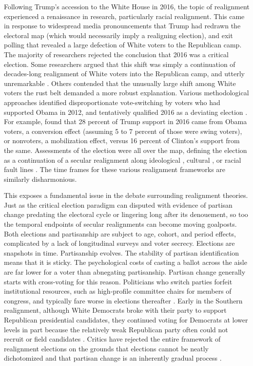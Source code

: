 Following Trump's accession to the White House in 2016, the topic of realignment experienced a renaissance in research, particularly racial realignment. This came in response to widespread media pronouncements that Trump had redrawn the electoral map (which would necessarily imply a realigning election), and exit polling that revealed a large defection of White voters to the Republican camp. The majority of researchers rejected the conclusion that 2016 was a critical election. Some researchers argued that this shift was simply a continuation of decades-long realignment of White voters into the Republican camp, and utterly unremarkable \citep{carnes_white_2021, johnston_was_2017, bartels_analysis_2016}. Others contended that the unusually large shift among White voters the rust belt demanded a more robust explanation. Various methodological approaches identified disproportionate vote-switching by voters who had supported Obama in 2012, and tentatively qualified 2016 as a deviating election \citep{morgan_trump_2018, reny_vote_2019, mutz_status_2018}. For example, \citet{morgan_trump_2018} found that 28 percent of Trump support in 2016 came from Obama voters, a conversion effect (assuming 5 to 7 percent of those were swing voters), or nonvoters, a mobilization effect, versus 16 percent of Clinton's support from the same. Assessments of the election were all over the map, defining the election as a continuation of a secular realignment along ideological \citep{abramowitz_united_2019}, cultural \citep{highton_cultural_2020}, or racial fault lines \citep{kitschelt_secular_2019}. The time frames for these various realignment frameworks are similarly disharmonious. 

This exposes a fundamental issue in the debate surrounding realignment theories. Just as the critical election paradigm can disputed with evidence of partisan change predating the electoral cycle or lingering long after its denouement, so too the temporal endpoints of secular realignments can become moving goalposts. Both elections and partisanship are subject to age, cohort, and period effects, complicated by a lack of longitudinal surveys and voter secrecy. Elections are snapshots in time. Partisanship evolves. The stability of partisan identification means that it is sticky. The psychological costs of casting a ballot across the aisle are far lower for a voter than abnegating partisanship. Partisan change generally starts with cross-voting for this reason. Politicians who switch parties forfeit institutional resources, such as high-profile committee chairs for members of congress, and typically fare worse in elections thereafter \citep{grose_electoral_2003}. Early in the Southern realignment, although White Democrats broke with their party to support Republican presidential candidates, they continued voting for Democrats at lower levels in part because the relatively weak Republican party often could not recruit or field candidates \citep{black_rise_2009}. Critics have rejected the entire framework of realignment elections on the grounds that elections cannot be neatly dichotomized and that partisan change is an inherently gradual process \citep{mayhew_electoral_2000, carmines_issue_1989}.   

